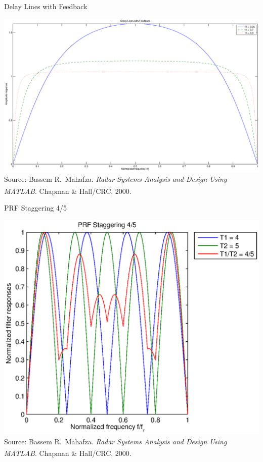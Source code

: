 \documentclass[mathserif]{beamer}
\begin{document}
    
    \begin{frame}{Delay Lines with Feedback}
      \begin{minipage}[t][0.8\textheight][t]{\textwidth}
	\includegraphics[width=\linewidth]{dlFeedback} \\
	\vfill
	\tiny{Source: Bassem R.~Mahafza. \emph{Radar Systems Analysis and Design Using MATLAB\textsuperscript{\textregistered}}. Chapman \& Hall/CRC, 2000.}
      \end{minipage}
    \end{frame}
   
    
    \begin{frame}{PRF Staggering 4/5}
      \begin{minipage}[t][0.8\textheight][t]{\textwidth}
	\centering
	\includegraphics[width=0.8\linewidth]{prfStaggering4_5} \\
	\vfill
	\tiny{Source: Bassem R.~Mahafza. \emph{Radar Systems Analysis and Design Using MATLAB\textsuperscript{\textregistered}}. Chapman \& Hall/CRC, 2000.}
      \end{minipage}
    \end{frame}
    
\end{document}
